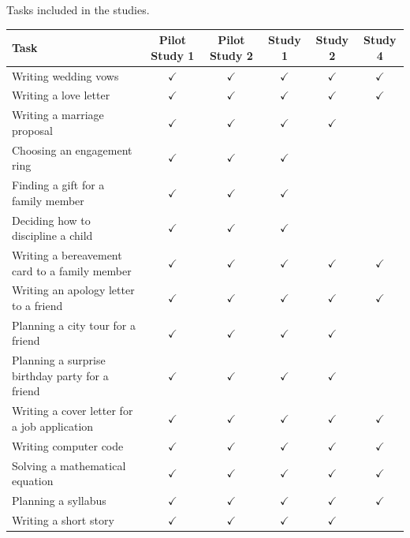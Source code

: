 \documentclass[
  man,
  floatsintext,
  longtable,
  nolmodern,
  notxfonts,
  notimes,
  colorlinks=true,linkcolor=blue,citecolor=blue,urlcolor=blue]{apa7}
\begin{document}
\begin{supptbl}[H]

\caption{\label{supptbl-tasks}Tasks included in the studies.}

\begin{minipage}{\linewidth}

\centering\begingroup\fontsize{10}{12}\selectfont

\begin{tabular}{lccccc}
\toprule
Task & Pilot Study 1 & Pilot Study 2 & Study 1 & Study 2 & Study 4\\
\midrule
Writing wedding vows & $\checkmark$ & $\checkmark$ & $\checkmark$ & $\checkmark$ & $\checkmark$\\
Writing a love letter & $\checkmark$ & $\checkmark$ & $\checkmark$ & $\checkmark$ & $\checkmark$\\
Writing a marriage proposal & $\checkmark$ & $\checkmark$ & $\checkmark$ & $\checkmark$ & \\
Choosing an engagement ring & $\checkmark$ & $\checkmark$ & $\checkmark$ &  & \\
Finding a gift for a family member & $\checkmark$ & $\checkmark$ & $\checkmark$ &  & \\
Deciding how to discipline a child & $\checkmark$ & $\checkmark$ & $\checkmark$ &  & \\
Writing a bereavement card to a family member & $\checkmark$ & $\checkmark$ & $\checkmark$ & $\checkmark$ & $\checkmark$\\
Writing an apology letter to a friend & $\checkmark$ & $\checkmark$ & $\checkmark$ & $\checkmark$ & $\checkmark$\\
Planning a city tour for a friend & $\checkmark$ & $\checkmark$ & $\checkmark$ & $\checkmark$ & \\
Planning a surprise birthday party for a friend & $\checkmark$ & $\checkmark$ & $\checkmark$ & $\checkmark$ & \\
Writing a cover letter for a job application & $\checkmark$ & $\checkmark$ & $\checkmark$ & $\checkmark$ & $\checkmark$\\
Writing computer code & $\checkmark$ & $\checkmark$ & $\checkmark$ & $\checkmark$ & $\checkmark$\\
Solving a mathematical equation & $\checkmark$ & $\checkmark$ & $\checkmark$ & $\checkmark$ & $\checkmark$\\
Planning a syllabus & $\checkmark$ & $\checkmark$ & $\checkmark$ & $\checkmark$ & $\checkmark$\\
Writing a short story & $\checkmark$ & $\checkmark$ & $\checkmark$ & $\checkmark$ & \\

\end{tabular}
\end{minipage}
\end{supptbl}
\end{document}
